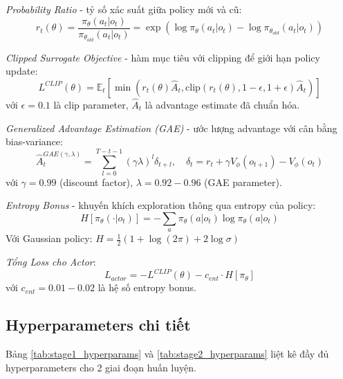 \textit{Probability Ratio} - tỷ số xác suất giữa policy mới và cũ:
\begin{equation}
r_t(\theta) = \frac{\pi_\theta(a_t|o_t)}{\pi_{\theta_{old}}(a_t|o_t)} = \exp(\log \pi_\theta(a_t|o_t) - \log \pi_{\theta_{old}}(a_t|o_t))
\end{equation}

\textit{Clipped Surrogate Objective} - hàm mục tiêu với clipping để giới hạn policy update:
\begin{equation}
L^{CLIP}(\theta) = \mathbb{E}_t \left[ \min \left( r_t(\theta) \hat{A}_t, \text{clip}(r_t(\theta), 1-\epsilon, 1+\epsilon) \hat{A}_t \right) \right]
\end{equation}
với $\epsilon = 0.1$ là clip parameter, $\hat{A}_t$ là advantage estimate đã chuẩn hóa.

\textit{Generalized Advantage Estimation (GAE)} - ước lượng advantage với cân bằng bias-variance:
\begin{equation}
\hat{A}_t^{GAE(\gamma, \lambda)} = \sum_{l=0}^{T-t-1} (\gamma \lambda)^l \delta_{t+l}, \quad \delta_t = r_t + \gamma V_\phi(o_{t+1}) - V_\phi(o_t)
\end{equation}
với $\gamma = 0.99$ (discount factor), $\lambda = 0.92-0.96$ (GAE parameter).

\textit{Entropy Bonus} - khuyến khích exploration thông qua entropy của policy:
\begin{equation}
H[\pi_\theta(\cdot|o_t)] = -\sum_a \pi_\theta(a|o_t) \log \pi_\theta(a|o_t)
\end{equation}
Với Gaussian policy: $H = \frac{1}{2}(1 + \log(2\pi) + 2\log\sigma)$

\textit{Tổng Loss cho Actor}:
\begin{equation}
L_{actor} = -L^{CLIP}(\theta) - c_{ent} \cdot H[\pi_\theta]
\end{equation}
với $c_{ent} = 0.01-0.02$ là hệ số entropy bonus.

\subsection{Hyperparameters chi tiết}

Bảng \ref{tab:stage1_hyperparams} và \ref{tab:stage2_hyperparams} liệt kê đầy đủ hyperparameters cho 2 giai đoạn huấn luyện.

